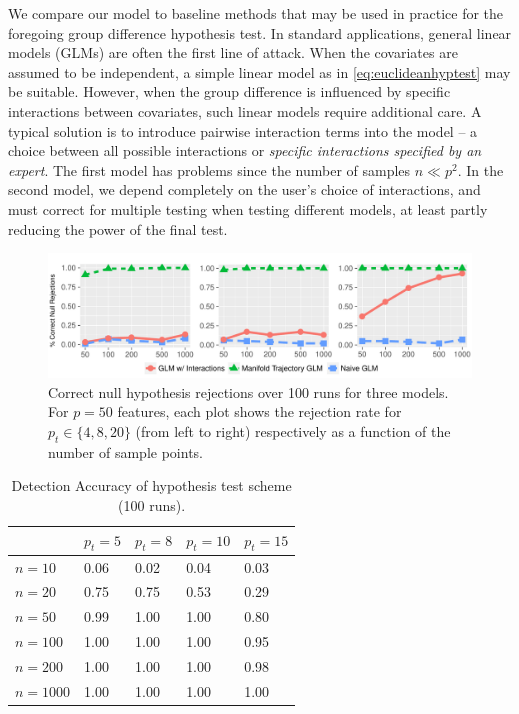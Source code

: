 	
We compare our model to baseline methods that may be used in practice for the foregoing 
group difference hypothesis test. In standard applications, general linear models (GLMs) are often the first line of attack. 
When the covariates are assumed to be independent, a simple linear model as in \eqref{eq:euclideanhyptest} may be suitable. 
However, when the group difference is influenced by specific interactions between covariates, such linear models require additional care. 
A typical solution is to introduce pairwise interaction terms into the model -- a choice between 
all possible interactions or \textit{specific interactions specified by an expert}. The first model has 
problems since the number of samples $n \ll p^2$. In the second model, we depend completely on the user's choice of interactions, 
and must correct for multiple testing when testing different models, at least partly reducing the power of the final test.
%
\begin{figure}[!]
	\begin{center}
		\includegraphics[width=\textwidth]{3_covtraj/figs/sim_results.pdf}
		\caption[Synthetic hypothesis testing true positive rates]{\label{fg:sim_graphs}{\footnotesize Correct null hypothesis rejections over 100 runs for three models. For $p = 50$ features, each plot shows the rejection rate
		for $p_t \in \{4, 8, 20\}$ (from left to right) respectively as a function of the number of sample points.} }
	\end{center}
\end{figure}
%	
\begin{table}[]
	{
		\caption{Detection Accuracy of hypothesis test scheme (100 runs).}
		\begin{center}
			{\begin{tabular}{lllll}
					\toprule
					\toprule
					& $p_t = 5$& $p_t = 8$	& $p_t = 10$&  $p_t = 15$ 	\\
					\midrule
					$n=10$	&  0.06  &  0.02  &  0.04  &  0.03 \\
					$n=20$	&  0.75  &  0.75  &  0.53  &  0.29 \\
					$n=50$	&  0.99  &  1.00  &  1.00  &  0.80 \\
					$n=100$	&  1.00  &  1.00  &  1.00  &  0.95 \\
					$n=200$	&  1.00  &  1.00  &  1.00  &  0.98 \\
					$n=1000$&  1.00  &  1.00  &  1.00  &  1.00 \\
					\bottomrule
					\bottomrule
			\end{tabular}}
		\end{center}
	}
	\label{recover-table}
\end{table}
